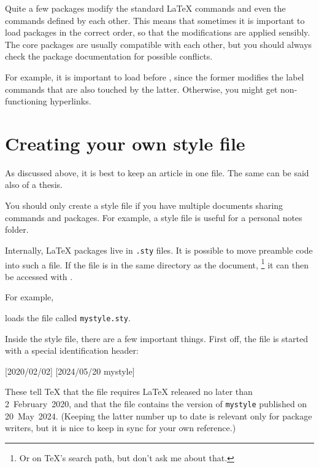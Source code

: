 \begin{gotcha}
Quite a few packages modify the standard \LaTeX{} commands
and even the commands defined by each other.
This means that sometimes it is important to load packages in the correct order,
so that the modifications are applied sensibly.
The core packages are usually compatible with each other,
but you should always check the package documentation for possible conflicts.

For example, it is important to load  before ,
since the former modifies the label commands that are also touched by the latter.
Otherwise, you might get non-functioning hyperlinks.
\end{gotcha}



\section{Creating your own style file}

\begin{practices}
As discussed above, it is best to keep an article in one file.
The same can be said also of a thesis.

You should only create a style file if you have multiple documents sharing commands and packages.
For example, a style file is useful for a personal notes folder.
\end{practices}


Internally, \LaTeX{} packages live in \verb|.sty| files.
It is possible to move preamble code into such a file.
If the file is in the same directory as the document,%
\footnote{Or on \TeX's search path, but don't ask me about that.}
it can then be accessed with .

For example,
\begin{ExampleCode}
\usepackage{mystyle}
\end{ExampleCode}
loads the file called \verb|mystyle.sty|.


Inside the style file, there are a few important things.
First off, the file is started with a special identification header:
%
\begin{ExampleCode}
[2020/02/02]
[2024/05/20 mystyle]
\end{ExampleCode}
%
These tell \TeX{} that the file requires \LaTeX{} released no later than 2~February~2020,
and that the file contains the version of \verb|mystyle| published on 20~May~2024.
(Keeping the latter number up to date is relevant only for package writers,
but it is nice to keep in sync for your own reference.)

